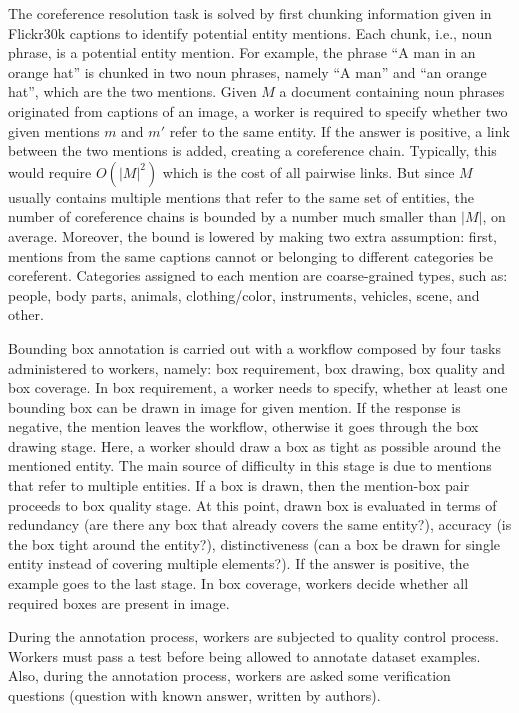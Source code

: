 The coreference resolution task is solved by first chunking
information given in Flickr30k captions to identify potential entity
mentions. Each chunk, i.e., noun phrase, is a potential entity
mention. For example, the phrase ``A man in an orange hat'' is chunked
in two noun phrases, namely ``A man'' and ``an orange hat'', which are
the two mentions. Given $M$ a document containing noun phrases
originated from captions of an image, a worker is required to specify
whether two given mentions $m$ and $m'$ refer to the same entity. If
the answer is positive, a link between the two mentions is added,
creating a coreference chain. Typically, this would require $O(|M|^2)$
which is the cost of all pairwise links. But since $M$ usually
contains multiple mentions that refer to the same set of entities, the
number of coreference chains is bounded by a number much smaller than
$|M|$, on average. Moreover, the bound is lowered by making two extra
assumption: first, mentions from the same captions cannot or belonging
to different categories be coreferent. Categories assigned to each
mention are coarse-grained types, such as: people, body parts,
animals, clothing/color, instruments, vehicles, scene, and other.

Bounding box annotation is carried out with a workflow composed by
four tasks administered to workers, namely: box requirement, box
drawing, box quality and box coverage. In box requirement, a worker
needs to specify, whether at least one bounding box can be drawn in
image for given mention. If the response is negative, the mention
leaves the workflow, otherwise it goes through the box drawing stage.
Here, a worker should draw a box as tight as possible around the
mentioned entity. The main source of difficulty in this stage is due
to mentions that refer to multiple entities. If a box is drawn, then
the mention-box pair proceeds to box quality stage. At this point,
drawn box is evaluated in terms of redundancy (are there any box that
already covers the same entity?), accuracy (is the box tight around
the entity?), distinctiveness (can a box be drawn for single entity
instead of covering multiple elements?). If the answer is positive,
the example goes to the last stage. In box coverage, workers decide
whether all required boxes are present in image. 

During the annotation process, workers are subjected to quality
control process. Workers must pass a test before being allowed to
annotate dataset examples. Also, during the annotation process,
workers are asked some verification questions (question with known
answer, written by authors).

